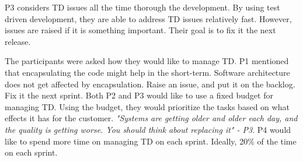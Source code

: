 P3 considers TD issues all the time thorough the development. By using test driven development, they are able to address TD issues relatively fast. However, issues are raised if it is something important. Their goal is to fix it the next release.  

The participants were asked how they would like to manage TD. P1 mentioned that encapsulating the code might help in the short-term. Software architecture does not get affected by encapsulation. Raise an issue, and put it on the backlog. Fix it the next sprint. Both P2 and P3 would like to use a fixed budget for managing TD. Using the budget, they would prioritize the tasks based on what effects it has for the customer. \textit{"Systems are getting older and older each day, and the quality is getting worse. You should think about replacing it" - P3}. P4 would like to spend more time on managing TD on each sprint. Ideally, 20\% of the time on each sprint.


